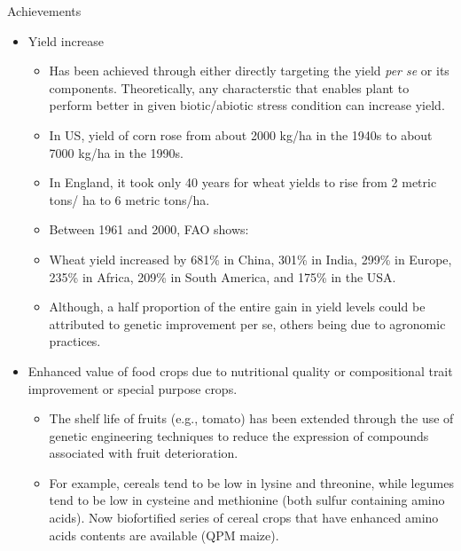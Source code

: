 \documentclass[11pt,ignorenonframetext,aspectratio=169]{beamer}
\providecommand{\tightlist}{%
  \setlength{\itemsep}{0pt}\setlength{\parskip}{0pt}}
\begin{document}
\begin{frame}{Achievements}
\begin{itemize}
\tightlist
\item
  Yield increase

  \begin{itemize}
  \item
    Has been achieved through either directly targeting the yield
    \emph{per se} or its components. Theoretically, any characterstic
    that enables plant to perform better in given biotic/abiotic stress
    condition can increase yield.
  \item
    In US, yield of corn rose from about 2000 kg/ha in the 1940s to
    about 7000 kg/ha in the 1990s.
  \item
    In England, it took only 40 years for wheat yields to rise from 2
    metric tons/ ha to 6 metric tons/ha.
  \item
    Between 1961 and 2000, FAO shows:
  \item
    Wheat yield increased by 681\% in China, 301\% in India, 299\% in
    Europe, 235\% in Africa, 209\% in South America, and 175\% in the
    USA.
  \item
    Although, a half proportion of the entire gain in yield levels could
    be attributed to genetic improvement per se, others being due to
    agronomic practices.
  \end{itemize}
\end{itemize}
\end{frame}

\begin{frame}{}
\protect\hypertarget{section-20}{}
\begin{itemize}
\tightlist
\item
  Enhanced value of food crops due to nutritional quality or
  compositional trait improvement or special purpose crops.

  \begin{itemize}
  \tightlist
  \item
    The shelf life of fruits (e.g., tomato) has been extended through
    the use of genetic engineering techniques to reduce the expression
    of compounds associated with fruit deterioration.
  \item
    For example, cereals tend to be low in lysine and threonine, while
    legumes tend to be low in cysteine and methionine (both sulfur
    containing amino acids). Now biofortified series of cereal crops
    that have enhanced amino acids contents are available (QPM maize).
  \end{itemize}
\end{itemize}
\end{frame}
\end{document}
